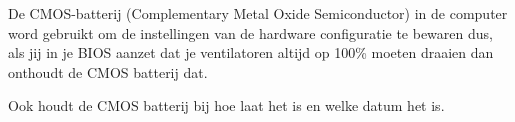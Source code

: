 De CMOS-batterij (Complementary Metal Oxide Semiconductor) in de computer word gebruikt om de instellingen van de hardware configuratie te bewaren dus, als jij in je BIOS aanzet dat je ventilatoren altijd op 100\% moeten draaien dan onthoudt de CMOS batterij dat.

Ook houdt de CMOS batterij bij hoe laat het is en welke datum het is.

